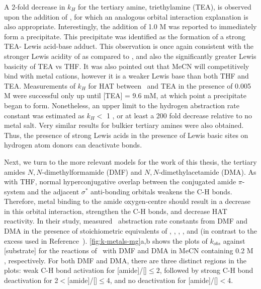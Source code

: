 A 2-fold decrease in $k_H$ for the tertiary amine, triethylamine (TEA), is
observed upon the addition of , for which an analogous orbital
interaction explanation is also appropriate. Interestingly, the addition of 1.0
M  was reported to immediately form a precipitate. This
precipitate was identified as the formation of a strong TEA- Lewis
acid-base adduct. This observation is once again consistent with the stronger
Lewis acidity of  as compared to , and also the
significantly greater Lewis basicity of TEA vs THF.\cite{Salamone2013a,
Reichardt2010} It was also pointed out that MeCN will competitively bind with
metal cations, however it is a weaker Lewis base than both THF and TEA.
Measurements of $k_H$ for HAT between \cumo\ and TEA in the presence of 0.005 M
 were successful only up until [TEA] = 9.6 mM, at which point a
precipitate began to form. Nonetheless, an upper limit to the hydrogen
abstraction rate constant was estimated as $k_H <$ 1 \Ms, or at least a 200
fold decrease relative to no metal salt. Very similar results for bulkier
tertiary amines were also obtained. Thus, the presence of strong Lewis acids in
the presence of Lewis basic sites on hydrogen atom donors can deactivate
 bonds.

Next, we turn to the more relevant models for the work of this thesis, the
tertiary amides $N,N$-dimethylformamide (DMF) and $N,N$-dimethylacetamide (DMA).
As with THF, normal hyperconjugative overlap between the conjugated amide
$\pi$-system and the adjacent  $\sigma^*$ anti-bonding orbitals weakens
the C-H bonds. Therefore, metal binding to the amide oxygen-centre should result
in a decrease in this orbital interaction, strengthen the C-H bonds, and
decrease HAT reactivity. In their study, \citet{Salamone2015metals} measured
\cumo\ abstraction rate constants from DMF and DMA in the presence of
stoichiometric equivalents of , , ,
, and  (in contrast to the excess used in
Reference~). \ref{fig:k-metals-mg}a,b shows the plots of
$k_{obs}$ against [substrate] for the reactions of \cumo\ with DMF and DMA in
MeCN containing 0.2 M , respectively. For both DMF and DMA, there
are three distinct regions in the plots: weak C-H bond activation for
[amide]/[]$\leq 2$, followed by strong C-H bond deactivation for
2$<$[amide]/[]$\leq$4, and no deactivation for
[amide]/[]$<$4.

